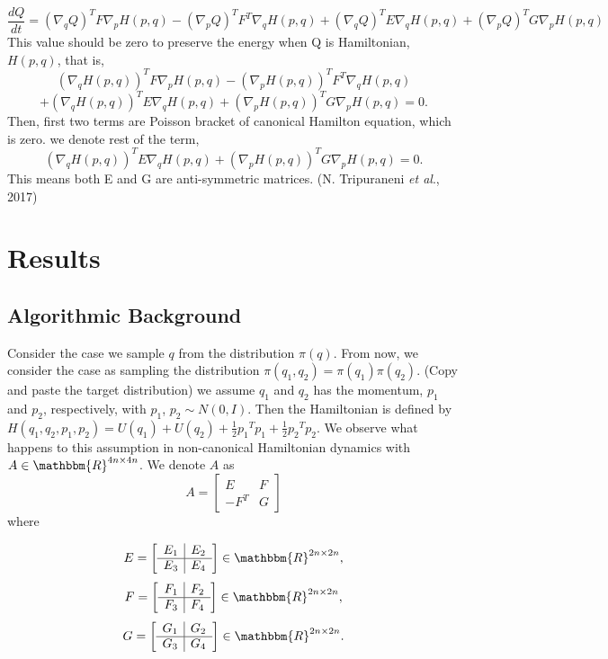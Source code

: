 \documentclass{article}
\begin{document}
$$\displaystyle\frac{dQ}{dt}
 = (\nabla_{q}Q)^T F \nabla_{p}H(p,q) - (\nabla_{p}Q)^T F^T \nabla_{q}H(p,q) + (\nabla_{q}Q)^T E \nabla_{q}H(p,q) + (\nabla_{p}Q)^T G \nabla_{p}H(p,q)$$
This value should be zero to preserve the energy when Q is Hamiltonian, $H(p,q)$, that is,
\[\displaystyle(\nabla_{q}H(p,q))^T F \nabla_{p}H(p,q) - (\nabla_{p}H(p,q))^T F^T \nabla_{q}H(p,q)\]
\[+ (\nabla_{q}H(p,q))^T E \nabla_{q}H(p,q) + (\nabla_{p}H(p,q))^T G \nabla_{p}H(p,q) = 0.\]
Then, first two terms are Poisson bracket of canonical Hamilton equation, which is zero. we denote rest of the term,
$$(\nabla_{q}H(p,q))^T E \nabla_{q}H(p,q) + (\nabla_{p}H(p,q))^T G \nabla_{p}H(p,q) = 0.$$
This means both E and G are anti-symmetric matrices. (N. Tripuraneni \textit{et al}., 2017)

\section{Results}
\subsection{Algorithmic Background}

Consider the case we sample $q$ from the distribution $\pi(q)$. From now, we consider the case as sampling the distribution $\pi(q_1 , q_2 ) = \pi(q_1)\pi (q_2)$. (Copy and paste the target distribution) we assume $q_1$ and $q_2$ has the momentum, $p_1$ and $p_2$, respectively, with $p_1$, $p_2 \sim N(0,I)$. Then the Hamiltonian is defined by $\displaystyle H(q_1, q_2, p_1, p_2)  = U(q_1) +U(q_2)+\frac{1}{2}{p_1}^T p_1 + \frac{1}{2}{p_2}^T p_2$. We observe what happens to this assumption in non-canonical Hamiltonian dynamics with $A \in \mathbbm{R}^{4n \times 4n} $. We denote $A$ as
\[
A=
\left[
\begin{array}{c|c}
E & F \\
\hline
-F^{T} & G
\end{array}
\right]
\] where

\[
E=
\left[
\begin{array}{c|c}
E_1 & E_2 \\
\hline
E_3 & E_4
\end{array}
\right] \in \mathbbm{R}^{2n \times 2n},
\]
\[
F=
\left[
\begin{array}{c|c}
F_1 & F_2 \\
\hline
F_3 & F_4
\end{array}
\right] \in \mathbbm{R}^{2n \times 2n},
\]
\[
G=
\left[
\begin{array}{c|c}
G_1 & G_2 \\
\hline
G_3 & G_4
\end{array}
\right] \in \mathbbm{R}^{2n \times 2n}.
\]
\\
\end{document}
